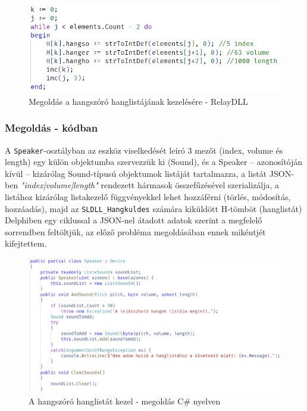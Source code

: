 \documentclass[tocnopagenum]{thesis-ekf}
\begin{document}
	\begin{figure}[H]
		\centering
		\includegraphics[scale=0.8]{speaker_solved}
		\caption{Megoldás a hangszóró hanglistájának kezelésére - RelayDLL}
		\label{speaker_solved}
	\end{figure}

	\subsubsection{Megoldás - kódban}
	A \verb*|Speaker|-osztályban az eszköz viselkedését leíró 3 mezőt (index, volume és length) egy külön objektumba szervezzük ki (Sound), és a Speaker -- azonosítóján kívül -- kizárólag Sound-típusú objektumok listáját tartalmazza, a listát JSON-ben \textit{"index|volume|length"} rendezett hármasok összefűzésével szerializálja, a listához kizárólag listakezelő függvényekkel lehet hozzáférni (törlés, módosítás, hozzáadás), majd az \verb*|SLDLL_Hangkuldes| számára kiküldött H-tömböt (hanglistát) Delphiben egy ciklussal a JSON-nel átadott adatok szerint a megfelelő sorrendben feltöltjük, az előző probléma megoldásában ennek mikéntjét kifejtettem.
	\begin{figure}[H]
		\centering
		\includegraphics[scale=0.53]{speaker_csharp}
		\caption{A hangszóró hanglistát kezel - megoldás C\# nyelven}
		\label{speaker_csharp}
	\end{figure}
\end{document}
